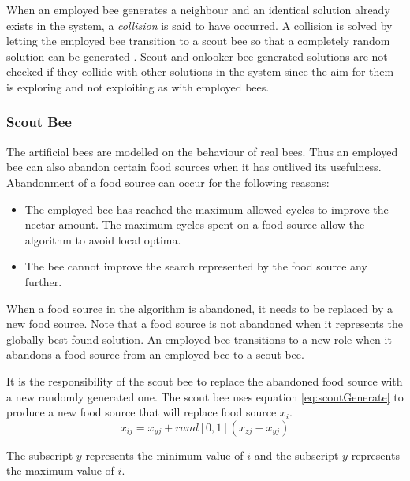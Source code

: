 When an employed bee generates a neighbour and an identical solution already exists in the system, a \emph{collision} is said to have occurred. A collision is solved by letting the employed bee transition to a scout bee so that a completely random solution can be generated \cite{ABCLeafConstrained}. Scout and onlooker bee generated solutions are not checked if they collide with other solutions in the system since the aim for them is exploring and not exploiting as with employed bees\cite{BeeJobShop,ABCCompareStudy}. 
\subsubsection{Scout Bee}
The artificial bees are modelled on the behaviour of real bees. Thus an employed bee can also abandon certain food sources when it has outlived its usefulness. Abandonment of a food source can occur for the following reasons\cite{BeeJobShop,ABCNumericalOptimization,ABCImageEnhancement}:
\begin{itemize}
\item The employed bee has reached the maximum allowed cycles to improve the nectar amount. The maximum cycles spent on a food source allow the algorithm to avoid local optima\cite{ABCCompareStudy,ABCNumericalOptimization,ABCImageEnhancement}.
\item The bee cannot improve the search represented by the food source any further\cite{ABCCompareStudy,ABCNumericalOptimization,ABCImageEnhancement}.
\end{itemize}
When a food source in the algorithm is abandoned, it needs to be replaced by a new food source\cite{BeeJobShop,ABCCompareStudy,ABCImageEnhancement}. Note that a food source is not abandoned when it represents the globally best-found solution. An employed bee transitions to a new role when it abandons a food source from an employed bee to a scout bee\cite{ABCCompareStudy,ABCNumericalOptimization,ABCImageEnhancement}. 

It is the responsibility of the scout bee to replace the abandoned food source with a new randomly generated one\cite{BeeJobShop,ABCCompareStudy,ABCImageEnhancement}. The scout bee uses equation \ref{eq:scoutGenerate} to produce a new food source that will replace food source $x_i$.
\begin{equation}
\label{eq:scoutGenerate}
x_{ij} = x_{yj} + rand[0,1](x_{zj} - x_{yj})
\end{equation}

The subscript $y$ represents the minimum value of $i$ and the subscript $y$ represents the maximum value of $i$.

